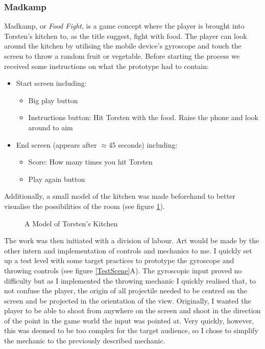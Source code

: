 \subsubsection{Madkamp}
Madkamp, or \textit{Food Fight}, is a game concept where the player is brought into Torsten's kitchen to, as the title suggest, fight with food. The player can look around the kitchen by utilising the mobile device's gyroscope and touch the screen to throw a random fruit or vegetable. \newline
Before starting the process we received some instructions on what the prototype had to contain:
\begin{itemize}
  \item Start screen including:
  \begin{itemize}
    \item Big play button
    \item Instructions button: Hit Torsten with the food. Raise the phone and look around to aim
  \end{itemize}
  \item End screen (appears after $\approx$45 seconds) including:
  \begin{itemize}
    \item Score: How many times you hit Torsten
    \item Play again button
  \end{itemize}
\end{itemize}
Additionally, a small model of the kitchen was made beforehand to better visualise the possibilities of the room (see figure \ref{kitchenmodel}).
\begin{center}
  \begin{figure}[!htb]
    \noindent{}
    \caption{A Model of Torsten's Kitchen}
    \label{kitchenmodel}
  \end{figure}
\end{center}
The work was then initiated with a division of labour. Art would be made by the other intern and implementation of controls and mechanics to me. I quickly set up a test level with some target practices to prototype the gyroscope and throwing controls (see figure \ref{TestScene}A). The gyroscopic input proved no difficulty but as I implemented the throwing mechanic I quickly realised that, to not confuse the player, the origin of all projectile needed to be centred on the screen and be projected in the orientation of the view. Originally, I wanted the player to be able to shoot from anywhere on the screen and shoot in the direction of the point in the game world the input was pointed at. Very quickly, however, this was deemed to be too complex for the target audience, so I chose to simplify the mechanic to the previously described mechanic.

